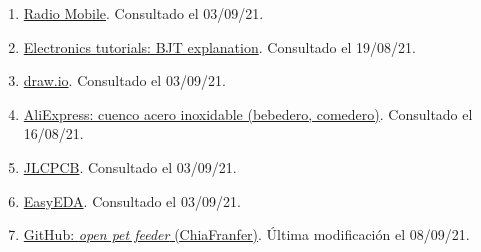 \documentclass[12pt]{article}
\begin{document}
\begin{enumerate}
			\item
			\label{radio mobile web}
			\href{https://www.ve2dbe.com/english1.html}{Radio Mobile}. Consultado el 03/09/21.
			
			\item
			\label{electronics tutos bjt}
			\href{https://www.electronics-tutorials.ws/transistor/tran_1.html}{Electronics tutorials: BJT explanation}. Consultado el 19/08/21.
			
			\item
			\label{draw.io web}
			\href{https://app.diagrams.net/}{draw.io}. Consultado el 03/09/21.
			
			
			
			

			
			
			\item 
			\label{bib: AliExpress cuenco}
			\href{https://es.aliexpress.com/item/1005001632098703.html?spm=a2g0s.9042311.0.0.274263c05XMd1Y}{AliExpress: cuenco acero inoxidable (bebedero, comedero)}. Consultado el 16/08/21.
			
			\item
			\label{jlcpcb web}
			\href{https://jlcpcb.com/}{JLCPCB}. Consultado el 03/09/21.
			
			\item
			\label{easyeda web}
			\href{https://easyeda.com/es}{EasyEDA}. Consultado el 03/09/21.
			
			\item
			\label{github repo}
			\href{https://github.com/ChiaFranfer/open-pet-feeder}{GitHub: \textit{open pet feeder} (ChiaFranfer)}. Última modificación el 08/09/21.
			

\end{enumerate}
\end{document}

